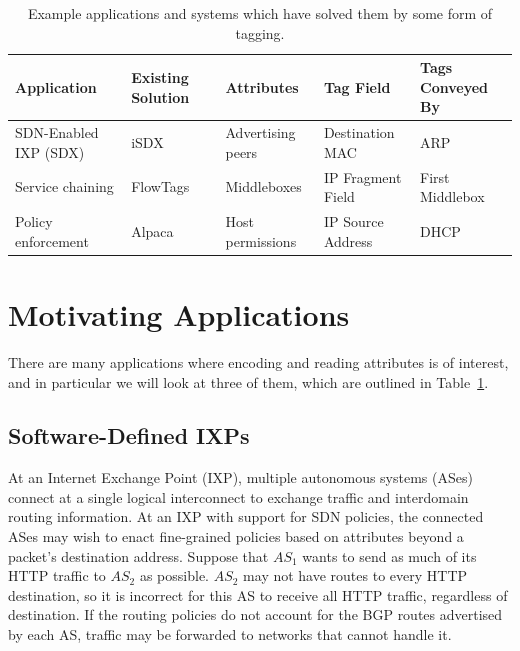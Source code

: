 \begin{table}
\begin{center}
    \begin{tabular}{|l|llll|}
    \hline
    {\bf Application} & 
    {\bf Existing Solution} & 
    {\bf Attributes} & 
    {\bf Tag Field} & 
    {\bf Tags Conveyed By}\\ \hline
    SDN-Enabled IXP (SDX) & iSDX~\cite{isdx} & Advertising peers & Destination MAC & ARP \\ 
    Service chaining & FlowTags~\cite{flowtags} & Middleboxes & IP Fragment Field & First Middlebox \\ 
    Policy enforcement & Alpaca~\cite{alpaca} & Host permissions & IP Source Address & DHCP \\ \hline
    \end{tabular}
\end{center}
    \caption{Example applications and systems which have solved them by some form of tagging.} 
    \label{tab:applications}
\end{table}

\section{Motivating Applications}
\label{sec:motivation}

There are many applications where encoding and reading attributes is
of interest, and in particular we will look at three of them, which
are outlined in Table~\ref{tab:applications}.
 
\subsection{Software-Defined IXPs}

At an Internet Exchange Point (IXP), multiple autonomous systems (ASes)
connect at a single logical interconnect to exchange traffic and
interdomain routing information.  At an IXP with support for SDN
policies, the connected ASes may wish to enact fine-grained 
policies based on attributes beyond a packet's destination
address. Suppose that $AS_1$ wants to send as much of its HTTP traffic
to $AS_2$ as possible. $AS_2$ may not have routes to every HTTP
destination, so it is incorrect for this AS to receive all HTTP traffic,
regardless of destination. If
the routing policies do not account for the BGP routes advertised by each 
AS, traffic may be forwarded to networks that cannot handle it.

